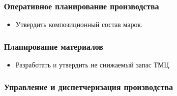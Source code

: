 \subsubsection{Оперативное планирование производства}
\begin{itemize}
\item Утвердить композиционный состав марок.

\end{itemize}

\subsubsection{Планирование материалов}

\begin{itemize}
\item Разработать и утвердить не снижаемый запас ТМЦ.
\end{itemize}


 \subsubsection{Управление и диспетчеризация производства}

